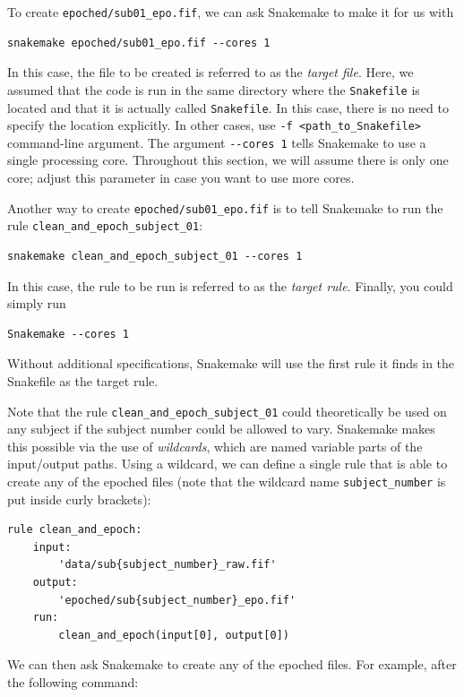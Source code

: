 \documentclass[a4paper,man,floatsintext,natbib]{apa6}
\begin{document}
To create \verb|epoched/sub01_epo.fif|, we can ask Snakemake to make it for us with

\begin{verbatim}
snakemake epoched/sub01_epo.fif --cores 1
\end{verbatim}

In this case, the file to be created is referred to as the \emph{target file}. Here, we assumed that the code is run in the same directory where the \verb|Snakefile| is located and that it is actually called \verb|Snakefile|. In this case, there is no need to specify the location explicitly. In other cases, use \verb|-f <path_to_Snakefile>| command-line argument. The argument \verb|--cores 1| tells Snakemake to use a single processing core. Throughout this section, we will assume there is only one core; adjust this parameter in case you want to use more cores.

Another way to create \verb|epoched/sub01_epo.fif| is to tell Snakemake to run the rule \verb|clean_and_epoch_subject_01|:

\begin{verbatim}
snakemake clean_and_epoch_subject_01 --cores 1
\end{verbatim}

In this case, the rule to be run is referred to as the \emph{target rule}. Finally, you could simply run 

\begin{verbatim}
Snakemake --cores 1
\end{verbatim}

Without additional specifications, Snakemake will use the first rule it finds in the Snakefile as the target rule.

Note that the rule \verb|clean_and_epoch_subject_01| could theoretically be used on any subject if the subject number could be allowed to vary. Snakemake makes this possible via the use of \emph{wildcards}, which are named variable parts of the input/output paths. Using a wildcard, we can define a single rule that is able to create any of the epoched files (note that the wildcard name \verb|subject_number| is put inside curly brackets):

\begin{verbatim}
rule clean_and_epoch:
    input:
        'data/sub{subject_number}_raw.fif'
    output:
        'epoched/sub{subject_number}_epo.fif'
    run:
        clean_and_epoch(input[0], output[0])
\end{verbatim}

We can then ask Snakemake to create any of the epoched files. For example, after the following command:
\end{document}
